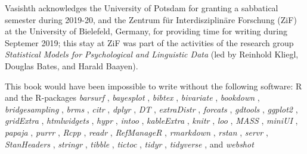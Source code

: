 \documentclass[12pt,]{krantz}
\theoremstyle{definition}
\theoremstyle{definition}
\theoremstyle{definition}
\theoremstyle{remark}
\begin{document}
Vasishth acknowledges the University of Potsdam for granting a
sabbatical semester during 2019-20, and the Zentrum für
Interdisziplinäre Forschung (ZiF) at the University of Bielefeld,
Germany, for providing time for writing during Septemer 2019; this stay
at ZiF was part of the activities of the research group
\emph{Statistical Models for Psychological and Linguistic Data} (led by
Reinhold Kliegl, Douglas Bates, and Harald Baayen).

This book would have been impossible to write without the following
software: R \citep[Version 3.6.3;][]{R-base} and the R-packages
\emph{barsurf} \citep[Version 0.5.0;][]{R-barsurf}, \emph{bayesplot}
\citep[Version 1.7.2;][]{R-bayesplot}, \emph{bibtex} \citep[Version
0.4.2.2;][]{R-bibtex}, \emph{bivariate} \citep[Version
0.5.0;][]{R-bivariate}, \emph{bookdown} \citep[Version
0.20.2;][]{R-bookdown}, \emph{bridgesampling} \citep[Version
1.0.0;][]{R-bridgesampling}, \emph{brms} \citep[Version
2.13.5;][]{R-brms}, \emph{citr} \citep[Version 0.3.2;][]{R-citr},
\emph{dplyr} \citep[Version 1.0.1;][]{R-dplyr}, \emph{DT} \citep[Version
0.15;][]{R-DT}, \emph{extraDistr} \citep[Version
1.8.11;][]{R-extraDistr}, \emph{forcats} \citep[Version
0.4.0;][]{R-forcats}, \emph{gdtools} \citep[Version
0.2.2;][]{R-gdtools}, \emph{ggplot2} \citep[Version
3.3.2;][]{R-ggplot2}, \emph{gridExtra} \citep[Version
2.3;][]{R-gridExtra}, \emph{htmlwidgets} \citep[Version
1.5.1;][]{R-htmlwidgets}, \emph{hypr} \citep[Version
0.1.9;][]{R-hypr_a, R-hypr_b}, \emph{intoo} \citep[Version
0.4.0;][]{R-intoo}, \emph{kableExtra} \citep[Version
1.1.0;][]{R-kableExtra}, \emph{knitr} \citep[Version 1.29;][]{R-knitr},
\emph{loo} \citep[Version 2.3.1;][]{R-loo_a, R-loo_b}, \emph{MASS}
\citep[Version 7.3.51.5;][]{R-MASS}, \emph{miniUI} \citep[Version
0.1.1.1;][]{R-miniUI}, \emph{papaja} \citep[Version
0.1.0.9942;][]{R-papaja}, \emph{purrr} \citep[Version
0.3.4;][]{R-purrr}, \emph{Rcpp} \citep[Version 1.0.5;][]{R-Rcpp},
\emph{readr} \citep[Version 1.3.1;][]{R-readr}, \emph{RefManageR}
\citep[Version 1.2.12;][]{R-RefManageR}, \emph{rmarkdown} \citep[Version
2.3.3;][]{R-rmarkdown}, \emph{rstan} \citep[Version 2.21.2;][]{R-rstan},
\emph{servr} \citep[Version 0.15;][]{R-servr}, \emph{StanHeaders}
\citep[Version 2.21.0.6;][]{R-StanHeaders}, \emph{stringr}
\citep[Version 1.4.0;][]{R-stringr}, \emph{tibble} \citep[Version
3.0.3;][]{R-tibble}, \emph{tictoc} \citep[Version 1.0;][]{R-tictoc},
\emph{tidyr} \citep[Version 1.1.0;][]{R-tidyr}, \emph{tidyverse}
\citep[Version 1.3.0;][]{R-tidyverse}, and \emph{webshot} \citep[Version
0.5.2;][]{R-webshot}
\end{document}
